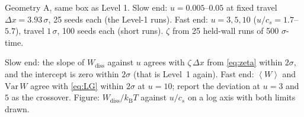 \documentclass[11pt,a4paper]{article}
\newcommand{\kT}{k_{\mathrm B}T}
\newcommand{\avg}[1]{\left\langle #1 \right\rangle}
\begin{document}
\begin{run}
Geometry A, same box as Level 1. Slow end: $u = 0.005$--$0.05$ at fixed travel $\Delta x = 3.93\,\sigma$, 25 seeds each (the Level-1 runs). Fast end: $u = 3, 5, 10$ ($u/c_s = 1.7$--$5.7$), travel $1\,\sigma$, 100 seeds each (short runs). $\zeta$ from 25 held-wall runs of 500 $\sigma$-time.
\end{run}
\begin{pass}
Slow end: the slope of $W_{\mathrm{diss}}$ against $u$ agrees with $\zeta\,\Delta x$ from \eqref{eq:zeta} within $2\sigma$, and the intercept is zero within $2\sigma$ (that is Level~1 again). Fast end: $\avg W$ and $\mathrm{Var}\,W$ agree with \eqref{eq:LG} within $2\sigma$ at $u = 10$; report the deviation at $u = 3$ and $5$ as the crossover. Figure: $W_{\mathrm{diss}}/\kT$ against $u/c_s$ on a log axis with both limits drawn.
\end{pass}
\end{document}
